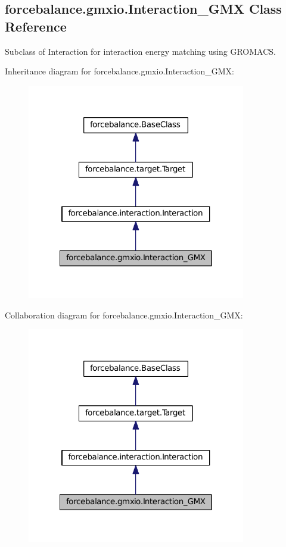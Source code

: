 \hypertarget{classforcebalance_1_1gmxio_1_1Interaction__GMX}{\subsection{forcebalance.\-gmxio.\-Interaction\-\_\-\-G\-M\-X \-Class \-Reference}
\label{classforcebalance_1_1gmxio_1_1Interaction__GMX}
}


\-Subclass of \-Interaction for interaction energy matching using \-G\-R\-O\-M\-A\-C\-S.  




\-Inheritance diagram for forcebalance.\-gmxio.\-Interaction\-\_\-\-G\-M\-X\-:\nopagebreak
\begin{figure}[H]
\begin{center}
\leavevmode
\includegraphics[width=270pt]{classforcebalance_1_1gmxio_1_1Interaction__GMX__inherit__graph}
\end{center}
\end{figure}


\-Collaboration diagram for forcebalance.\-gmxio.\-Interaction\-\_\-\-G\-M\-X\-:\nopagebreak
\begin{figure}[H]
\begin{center}
\leavevmode
\includegraphics[width=270pt]{classforcebalance_1_1gmxio_1_1Interaction__GMX__coll__graph}
\end{center}
\end{figure}

